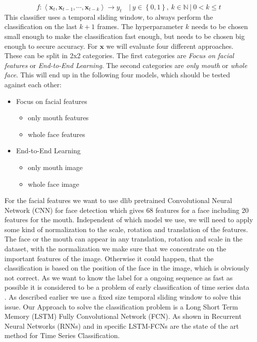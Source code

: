 \begin{equation}\label{eq:classifier}
f: \left\langle \mathbf{x}_{t}, \mathbf{x}_{t-1}, \cdots, \mathbf{x}_{t-k} \right\rangle \rightarrow y_{t} \quad |\ y \in \left\lbrace0,1\right\rbrace,\ k \in \mathbb{N}\ |\ 0<k\leq t
\end{equation}
This classifier uses a temporal sliding window, to always perform the classification on the last $k+1$ frames. The hyperparameter $k$ needs to be chosen  small enough to make the classification fast enough, but needs to be chosen big enough to secure accuracy.
For $\mathbf{x}$ we will evaluate four different approaches.
These can be split in 2x2 categories. The first categories are \emph{Focus on facial features} or \emph{End-to-End Learning}.
The second categories are \emph{only mouth} or \emph{whole face}.
This will end up in the following four models, which should be tested against each other:
\begin{itemize}
  \item Focus on facial features
  \begin{itemize}
  	\item only mouth features
  	\item whole face features
  \end{itemize}
  \item End-to-End Learning
  \begin{itemize}
  	\item only mouth image
  	\item whole face image
  \end{itemize}
\end{itemize}
For the facial features we want to use dlib\cite{Dlib} pretrained Convolutional Neural Network (CNN) for face detection which gives 68 features for a face including 20 features for the mouth.
Independent of which model we use, we will need to apply some kind of normalization to the scale, rotation and translation of the features. The face or the mouth can appear in any translation, rotation and scale in the dataset, with the normalization we make sure that we concentrate on the important features of the image. Otherwise it could happen, that the classification is based on the position of the face in the image, which is obviously not correct.
As we want to know the label for a ongoing sequence as fast as possible it is considered to be a problem of early classification of time series
data \cite{Xing2011}. As described earlier we use a fixed size temporal sliding window to solve this issue.
Our Approach to solve the classification problem is a Long Short Term Memory (LSTM) Fully Convolutional Network (FCN).
As shown in \cite{Fazle18} \cite{Fazle17} Recurrent Neural Networks (RNNs) and in specific LSTM-FCNs are the state of the art method for Time Series Classification.

